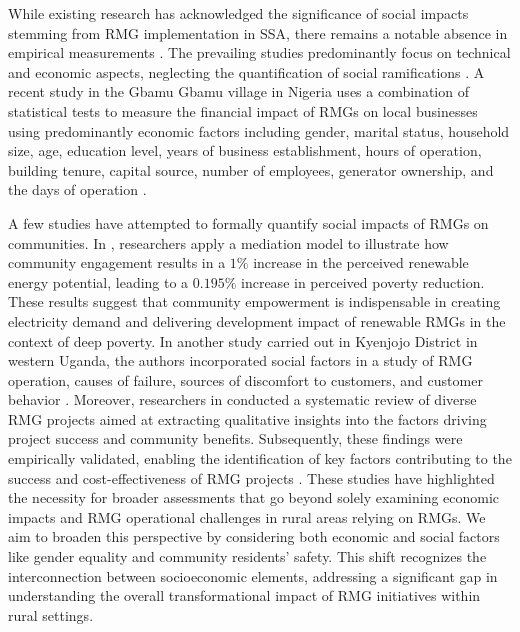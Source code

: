 While existing research has acknowledged the significance of social impacts stemming from RMG implementation in SSA, there remains a notable absence in empirical measurements \cite{eales2018social}. The prevailing studies predominantly focus on technical and economic aspects, neglecting the quantification of social ramifications \cite{pueyo2018impact, wassie2021socio, uwineza2021analysis, lee2020experimental}. A recent study in the Gbamu Gbamu village in Nigeria uses a combination of statistical tests to measure the financial impact of RMGs on local businesses using predominantly economic factors including gender, marital status, household size, age, education level, years of business establishment, hours of operation, building tenure, capital source, number of employees, generator ownership, and the days of operation \cite{babalola2022socio}. 

A few studies have attempted to formally quantify social impacts of RMGs on communities. In \cite{liu2021enabling}, researchers apply a mediation model to illustrate how community engagement results in a  $1\%$ increase in the perceived renewable energy potential, leading to a $0.195\%$ increase in perceived poverty reduction. These results suggest that community empowerment is indispensable in creating electricity demand and delivering development impact of renewable RMGs in the context of deep poverty. In another study carried out in Kyenjojo District in western Uganda, the authors incorporated social factors in a study of RMG  operation, causes of failure, sources of discomfort to customers, and customer behavior \cite{cartland2022socio}. Moreover, researchers in \cite{duran2021analysis} conducted a systematic review of diverse RMG projects aimed at extracting qualitative insights into the factors driving project success and community benefits. Subsequently, these findings were empirically validated, enabling the identification of key factors contributing to the success and cost-effectiveness of RMG projects \cite{nyarko2023drivers}. These studies have highlighted the necessity for broader assessments that go beyond solely examining economic impacts and RMG operational challenges in rural areas relying on RMGs. We aim to broaden this perspective by considering both economic and social factors like gender equality and community residents' safety. This shift recognizes the interconnection between socioeconomic elements, addressing a significant gap in understanding the overall transformational impact of RMG initiatives within rural settings. 

